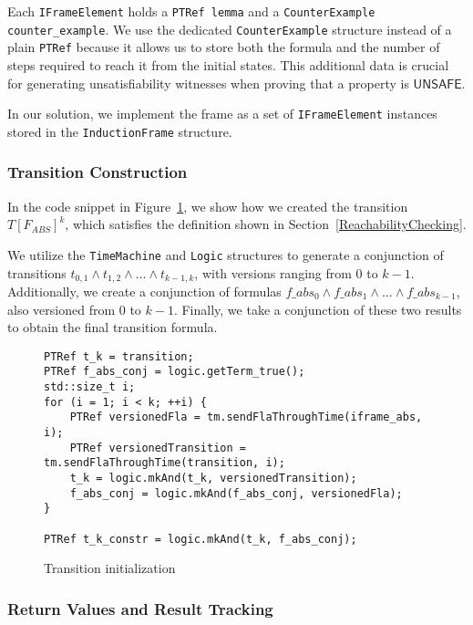 Each \texttt{IFrameElement} holds a \texttt{PTRef lemma} and a
\texttt{CounterExample counter\_example}. We use the dedicated
\texttt{CounterExample} structure instead of a plain \texttt{PTRef} because it
allows us to store both the formula and the number of steps required to reach
it from the initial states. This additional data is crucial for generating
unsatisfiability witnesses when proving that a property is \( \mathsf{UNSAFE}
\).

In our solution, we implement the frame as a set of \texttt{IFrameElement}
instances stored in the \texttt{InductionFrame} structure.

\subsubsection{Transition Construction}

\noindent In the code snippet in
Figure~\ref{code:TransitionGen}, we show
how we created the transition $T[F_{ABS}]^k$, which satisfies the definition
shown in Section~\ref{ReachabilityChecking}.

We utilize the \texttt{TimeMachine} and \texttt{Logic} structures to generate a
conjunction of transitions $t_{0,1} \wedge t_{1,2} \wedge \dots \wedge
t_{k-1,k}$, with versions ranging from 0 to \( k-1 \). Additionally, we create
a conjunction of formulas $f\_abs_0 \wedge f\_abs_1 \wedge \dots \wedge
f\_abs_{k-1}$, also versioned from 0 to \( k-1 \). Finally, we take a
conjunction of these two results to obtain the final transition formula.

\begin{figure}[H]
\begin{lstlisting}
PTRef t_k = transition;
PTRef f_abs_conj = logic.getTerm_true();
std::size_t i;
for (i = 1; i < k; ++i) {
    PTRef versionedFla = tm.sendFlaThroughTime(iframe_abs, i);
    PTRef versionedTransition = tm.sendFlaThroughTime(transition, i);
    t_k = logic.mkAnd(t_k, versionedTransition);
    f_abs_conj = logic.mkAnd(f_abs_conj, versionedFla);
}

PTRef t_k_constr = logic.mkAnd(t_k, f_abs_conj);
\end{lstlisting}
\caption{Transition initialization}\label{code:TransitionGen}
\end{figure}

\subsubsection{Return Values and Result Tracking}

